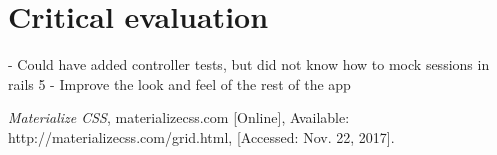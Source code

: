 \documentclass[a4paper, 11pt, titlepage]{article}
\begin{document}
\section{Critical evaluation}
- Could have added controller tests, but did not know how to mock sessions in rails 5
- Improve the look and feel of the rest of the app

\begin{thebibliography}{1}

 \emph{Materialize CSS}, materializecss.com [Online],
Available: http://materializecss.com/grid.html, [Accessed: Nov. 22, 2017].

\end{thebibliography}
\end{document}
